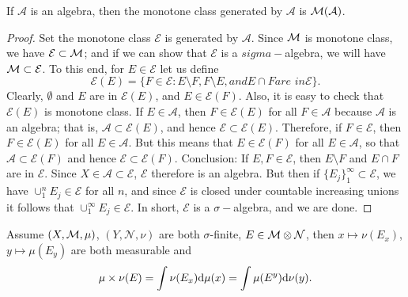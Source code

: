 \begin{lem}
    \label{Lem:MonotoneClassLemma}
    If $\mathcal{A}$ is an algebra, then the monotone class 
    generated by $\mathcal{A}$ is $\mathcal{M}(\mathcal{A})$.
\end{lem}
\begin{proof}
    Set the monotone class $\mathcal{E}$ is generated by 
    $\mathcal{A}$. Since $\mathcal{M}$ is monotone class, we have
    $\mathcal{E}\subset\mathcal{M}$; and if we can show that $\mathcal{E}$
    is a $sigma-$algebra, we will have $\mathcal{M}\subset\mathcal{E}$.
    To this end, for $E\in\mathcal{E}$ let us define
    \begin{displaymath}
        \mathcal{E}(E)=\{F\in\mathcal{E}:E\setminus F,F\setminus E,
        \textit{and} E\cap F \textit{are in} \mathcal{E}\}.
    \end{displaymath}
    Clearly, $\emptyset$ and $E$ are in $\mathcal{E}(E)$, and 
    $E\in\mathcal{E}(F)$. Also, it is easy to check that $\mathcal{E}(E)$
    is monotone class. If $E\in\mathcal{A}$, then $F\in\mathcal{E}(E)$
    for all $F\in\mathcal{A}$ because $\mathcal{A}$ is an algebra; that is,
    $\mathcal{A}\subset\mathcal{E}(E)$, and hence $\mathcal{E}\subset
    \mathcal{E}(E)$. Therefore, if $F\in\mathcal{E}$, then $F\in
    \mathcal{E}(E)$ for all $E\in\mathcal{A}$. But this means that $E\in
    \mathcal{E}(F)$ for all $E\in\mathcal{A}$, so that $\mathcal{A}\subset
    \mathcal{E}(F)$ and hence $\mathcal{E}\subset\mathcal{E}(F)$. Conclusion:
    If $E,F\in\mathcal{E}$, then $E\setminus F$ and $E\cap F$ are in 
    $\mathcal{E}$. Since $X\in\mathcal{A}\subset\mathcal{E}$, $\mathcal{E}$ 
    therefore is an algebra. But then if $\{E_j\}_{1}^{\infty}\subset
    \mathcal{E}$, we have $\cup_{1}^{n}E_j\in\mathcal{E}$ for all $n$,
    and since $\mathcal{E}$ is closed under countable increasing unions
    it follows that $\cup_{1}^{\infty}E_j\in\mathcal{E}$. In short, 
    $\mathcal{E}$ is a $\sigma-$algebra, and we are done.
\end{proof}
\begin{thm}
    \label{Thm:MultipleIntForSimple}
    Assume $(X,\mathcal{M},\mu)$, $(Y,\mathcal{N},\nu)$ are both $\sigma$-finite, 
    $E\in\mathcal{M}\otimes\mathcal{N}$, then $x\mapsto\nu(E_x)$, 
    $y\mapsto\mu(E_y)$ are both measurable and 
    \begin{displaymath}
        \mu\times\nu(E)=\int\nu(E_x)\mathrm{d}\mu(x)=\int\mu(E^{y})\mathrm{d}\nu(y).
    \end{displaymath}
\end{thm}
